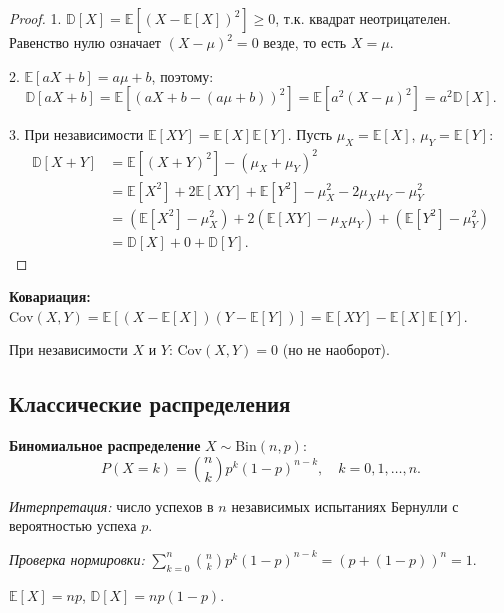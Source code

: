 \documentclass[12pt]{article}
\begin{document}
	\begin{proof}
		1. $\mathbb{D}[X] = \mathbb{E}[(X - \mathbb{E}[X])^2] \geqslant 0$, т.к. квадрат неотрицателен. Равенство нулю означает $(X - \mu)^2 = 0$ везде, то есть $X = \mu$.
		
		2. $\mathbb{E}[aX+b] = a\mu + b$, поэтому:
		\[\mathbb{D}[aX+b] = \mathbb{E}[(aX+b - (a\mu+b))^2] = \mathbb{E}[a^2(X-\mu)^2] = a^2 \mathbb{D}[X].\]
		
		3. При независимости $\mathbb{E}[XY] = \mathbb{E}[X]\mathbb{E}[Y]$. Пусть $\mu_X = \mathbb{E}[X]$, $\mu_Y = \mathbb{E}[Y]$:
		\begin{align*}
			\mathbb{D}[X+Y] &= \mathbb{E}[(X+Y)^2] - (\mu_X + \mu_Y)^2 \\
			&= \mathbb{E}[X^2] + 2\mathbb{E}[XY] + \mathbb{E}[Y^2] - \mu_X^2 - 2\mu_X\mu_Y - \mu_Y^2 \\
			&= (\mathbb{E}[X^2] - \mu_X^2) + 2(\mathbb{E}[XY] - \mu_X\mu_Y) + (\mathbb{E}[Y^2] - \mu_Y^2) \\
			&= \mathbb{D}[X] + 0 + \mathbb{D}[Y].
		\end{align*}
	\end{proof}
	
	\begin{definition}
		\textbf{Ковариация:} $\text{Cov}(X, Y) = \mathbb{E}[(X - \mathbb{E}[X])(Y - \mathbb{E}[Y])] = \mathbb{E}[XY] - \mathbb{E}[X]\mathbb{E}[Y]$.
		
		При независимости $X$ и $Y$: $\text{Cov}(X, Y) = 0$ (но не наоборот).
	\end{definition}
	
	\subsection{Классические распределения}
	
	\textbf{Биномиальное распределение} $X \sim \text{Bin}(n, p)$:
	\[P(X = k) = \binom{n}{k} p^k (1-p)^{n-k}, \quad k = 0, 1, \dots, n.\]
	
	\textit{Интерпретация:} число успехов в $n$ независимых испытаниях Бернулли с вероятностью успеха $p$.
	
	\textit{Проверка нормировки:} $\sum_{k=0}^{n} \binom{n}{k} p^k (1-p)^{n-k} = (p + (1-p))^n = 1$.
	
	\begin{theorem}
		$\mathbb{E}[X] = np$, $\mathbb{D}[X] = np(1-p)$.
	\end{theorem}
	
\end{document}
